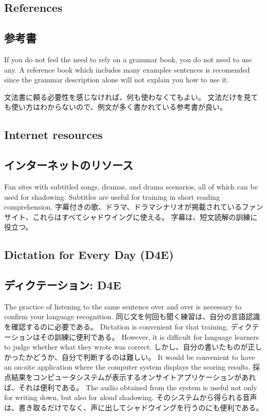 \documentclass[uplatex,dvipdfmx,b5paper,english,10pt]{jsbook}
\newif\ifREFERENCE
\begin{document}
\ifEnglish
\subsection{References}
\else
\subsection{参考書}
\fi

\ifEnglish
If you do not feel the need to rely on a grammar book, you do not need to use any.
A reference book which includes many examples sentences is recomended since the grammar description alone will not explain you how to use it.
\ifREFERENCE
\cite{Kaiser_Butler200103} is one of the choices we recommend as a dictionary which includes significant examples.
\fi
\else
文法書に頼る必要性を感じなければ、何も使わなくてもよい。
文法だけを見ても使い方はわからないので、例文が多く書かれている参考書が良い。
\ifREFERENCE
\cite{Kaiser_Butler200103}は実際の新聞記事より採取した例文が掲載されている数少ない選択肢の1つである。
\fi
\fi

\ifEnglish
\subsection{Internet resources}
\else
\subsection{インターネットのリソース}
\fi

\ifEnglish
Fan sites with subtitled songs, dramas, and drama scenarios, all of which can be used for shadowing.
Subtitles are useful for training in short reading comprehension.
\else
字幕付きの歌、ドラマ、ドラマシナリオが掲載されているファンサイト、これらはすべてシャドウイングに使える。
字幕は、短文読解の訓練に役立つ。
\fi

\ifEnglish
\subsection{Dictation for Every Day (D4E)}
\else
\subsection{ディクテーション: D4E}
\fi

\ifEnglish
The practice of listening to the same sentence over and over is necessary to confirm your language recognition.
\else
同じ文を何回も聞く練習は、自分の言語認識を確認するのに必要である。
\fi
\ifEnglish
Dictation is convenient for that training.
\else
ディクテーションはその訓練に便利である。
\fi
\ifEnglish
However, it is difficult for language learners to judge whether what they wrote was correct.
\else
しかし、自分の書いたものが正しかったかどうか、自分で判断するのは難しい。
\fi
\ifEnglish
It would be convenient to have an on-site application where the computer system displays the scoring results.
\else
採点結果をコンピュータシステムが表示するオンサイトアプリケーションがあれば、それは便利である。
\fi
\ifEnglish
The audio obtained from the system is useful not only for writing down, but also for aloud shadowing.
\else
そのシステムから得られる音声は、書き取るだけでなく、声に出してシャドウイングを行うのにも便利である。
\fi
\end{document}
